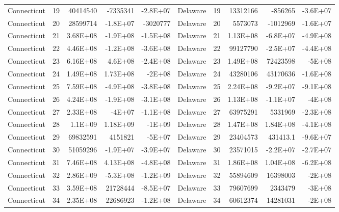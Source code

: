 \begin{landscape}
\begin{singlespace}
\begin{longtable}{lrrrr|lrrrr}
		Connecticut &  19 & 40414540 & -7335341 & -2.8E+07 & Delaware &  19 & 13312166 & -856265 & -3.6E+07 \\
		Connecticut &  20 & 28599714 & -1.8E+07 & -3020777 & Delaware &  20 & 5573073 & -1012969 & -1.6E+07 \\
		Connecticut &  21 & 3.68E+08 & -1.9E+08 & -1.5E+08 & Delaware &  21 & 1.13E+08 & -6.8E+07 & -4.9E+08 \\
		Connecticut &  22 & 4.46E+08 & -1.2E+08 & -3.6E+08 & Delaware &  22 & 99127790 & -2.5E+07 & -4.4E+08 \\
		Connecticut &  23 & 6.16E+08 & 4.6E+08 & -2.4E+08 & Delaware &  23 & 1.49E+08 & 72423598 & -5E+08 \\
		Connecticut &  24 & 1.49E+08 & 1.73E+08 & -2E+08 & Delaware &  24 & 43280106 & 43170636 & -1.6E+08 \\
		Connecticut &  25 & 7.59E+08 & -4.9E+08 & -3.8E+08 & Delaware &  25 & 2.24E+08 & -9.2E+07 & -9.1E+08 \\
		Connecticut &  26 & 4.24E+08 & -1.9E+08 & -3.1E+08 & Delaware &  26 & 1.13E+08 & -1.1E+07 & -4E+08 \\
		Connecticut &  27 & 2.33E+08 & -4E+07 & -1.1E+08 & Delaware &  27 & 63975291 & 5331969 & -2.3E+08 \\
		Connecticut &  28 & 1.1E+09 & 1.18E+09 & -1E+09 & Delaware &  28 & 1.47E+08 & 1.84E+08 & -4.1E+08 \\
		Connecticut &  29 & 69832591 & 4151821 & -5E+07 & Delaware &  29 & 23404573 & 431413.1 & -9.6E+07 \\
		Connecticut &  30 & 51059296 & -1.9E+07 & -3.9E+07 & Delaware &  30 & 23571015 & -2.2E+07 & -2.7E+07 \\
		Connecticut &  31 & 7.46E+08 & 4.13E+08 & -4.8E+08 & Delaware &  31 & 1.86E+08 & 1.04E+08 & -6.2E+08 \\
		Connecticut &  32 & 2.86E+09 & -5.3E+08 & -1.2E+09 & Delaware &  32 & 55894609 & 16398003 & -2E+08 \\
		Connecticut &  33 & 3.59E+08 & 21728444 & -8.5E+07 & Delaware &  33 & 79607699 & 2343479 & -3E+08 \\
		Connecticut &  34 & 2.35E+08 & 22686923 & -1.2E+08 & Delaware &  34 & 60612374 & 14281031 & -2E+08\\


\end{longtable}
\end{singlespace}
\end{landscape}
